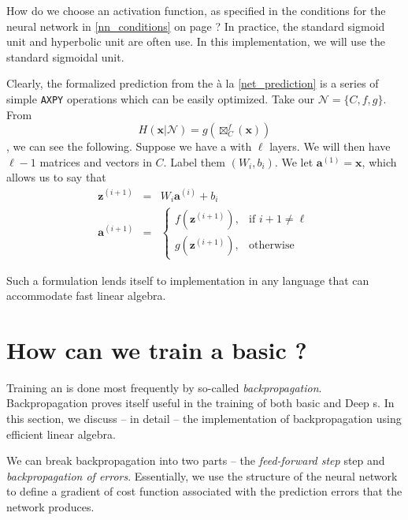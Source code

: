 How do we choose an activation function, as specified in the conditions for the neural network in \ref{nn_conditions} on page \pageref{nn_conditions}? In practice, the standard sigmoid unit and hyperbolic unit are often use. In this implementation, we will use the standard sigmoidal unit.

Clearly, the formalized prediction from the \nn{} \`{a} la \eqref{net_prediction} is a series of simple \texttt{AXPY} operations which can be easily optimized. Take our \nn{} $\mathcal{N}=\{ C, f, g \}$. From $$H(\mathbf{x} | \mathcal{N}) = g(\boxtimes_{C}^{f}(\mathbf{x}))$$, we can see the following. Suppose we have a \nn{} with $\ell$ layers. We will then have $\ell-1$ matrices and vectors in $C$. Label them $(W_i, b_i)$. We let $\mathbf{a}^{(1)} = \mathbf{x}$,  which allows us to say that 
\begin{eqnarray}
\mathbf{z}^{(i+1)} &=& W_i \mathbf{a}^{(i)} + b_i\\
\mathbf{a}^{(i+1)} &=& 
	\begin{cases} 
		f(\mathbf{z}^{(i+1)}), & \mbox{if } i+1 \neq \ell \\ 
		g(\mathbf{z}^{(i+1)}), & \mbox{otherwise}
	\end{cases}
\end{eqnarray}

Such a formulation lends itself to implementation in any language that can accommodate fast linear algebra.

\section{How can we train a basic \ann{}?}
\label{basix}

Training an \ann{} is done most frequently by so-called \emph{backpropagation}. Backpropagation proves itself useful in the training of both basic and Deep \nn{}s. In this section, we discuss -- in detail -- the implementation of backpropagation using efficient linear algebra.

We can break backpropagation into two parts --  the \emph{feed-forward step} step and \emph{backpropagation of errors}. Essentially, we use the structure of the neural network to define a gradient of cost function associated with the prediction errors that the network produces. 

